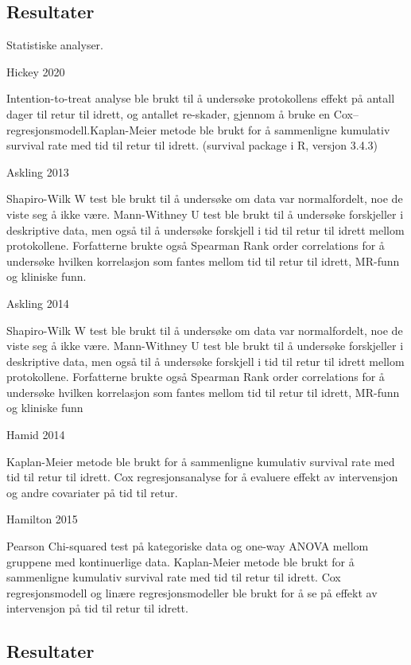 \documentclass[
]{article}
\begin{document}
\hypertarget{resultater}{%
\subsection{Resultater}\label{resultater}}

Statistiske analyser.

Hickey 2020

Intention-to-treat analyse ble brukt til å undersøke protokollens effekt
på antall dager til retur til idrett, og antallet re-skader, gjennom å
bruke en Cox--regresjonsmodell.Kaplan-Meier metode ble brukt for å
sammenligne kumulativ survival rate med tid til retur til idrett.
(survival package i R, versjon 3.4.3)

Askling 2013

Shapiro-Wilk W test ble brukt til å undersøke om data var normalfordelt,
noe de viste seg å ikke være. Mann-Withney U test ble brukt til å
undersøke forskjeller i deskriptive data, men også til å undersøke
forskjell i tid til retur til idrett mellom protokollene. Forfatterne
brukte også Spearman Rank order correlations for å undersøke hvilken
korrelasjon som fantes mellom tid til retur til idrett, MR-funn og
kliniske funn.~

Askling 2014

Shapiro-Wilk W test ble brukt til å undersøke om data var normalfordelt,
noe de viste seg å ikke være. Mann-Withney U test ble brukt til å
undersøke forskjeller i deskriptive data, men også til å undersøke
forskjell i tid til retur til idrett mellom protokollene. Forfatterne
brukte også Spearman Rank order correlations for å undersøke hvilken
korrelasjon som fantes mellom tid til retur til idrett, MR-funn og
kliniske funn

Hamid 2014

Kaplan-Meier metode ble brukt for å sammenligne kumulativ survival rate
med tid til retur til idrett. Cox regresjonsanalyse for å evaluere
effekt av intervensjon og andre covariater på tid til retur.

Hamilton 2015

Pearson Chi-squared test på kategoriske data og one-way ANOVA mellom
gruppene med kontinuerlige data. Kaplan-Meier metode ble brukt for å
sammenligne kumulativ survival rate med tid til retur til idrett. Cox
regresjonsmodell og linære regresjonsmodeller ble brukt for å se på
effekt av intervensjon på tid til retur til idrett.

\hypertarget{resultater-1}{%
\subsection{Resultater}\label{resultater-1}}
\end{document}
